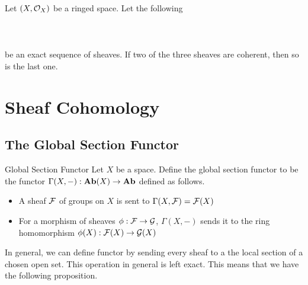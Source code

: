 \documentclass[a4paper]{article}
\begin{document}
\begin{prp}{}{} Let $(X,\mathcal{O}_X)$ be a ringed space. Let the following \\~\\
\\~\\
be an exact sequence of sheaves. If two of the three sheaves are coherent, then so is the last one. 
\end{prp}

\pagebreak
\section{Sheaf Cohomology}
\subsection{The Global Section Functor}
\begin{defn}{Global Section Functor}{} Let $X$ be a space. Define the global section functor to be the functor $\Gamma(X,-):\bold{Ab}(X)\to\bold{Ab}$ defined as follows. 
\begin{itemize}
\item A sheaf $\mathcal{F}$ of groups on $X$ is sent to $\Gamma(X,\mathcal{F})=\mathcal{F}(X)$
\item For a morphism of sheaves $\phi:\mathcal{F}\to\mathcal{G}$, $\Gamma(X,-)$ sends it to the ring homomorphism $\phi(X):\mathcal{F}(X)\to\mathcal{G}(X)$
\end{itemize}
\end{defn}

In general, we can define functor by sending every sheaf to a the local section of a chosen open set. This operation in general is left exact. This means that we have the following proposition. 
\end{document}
